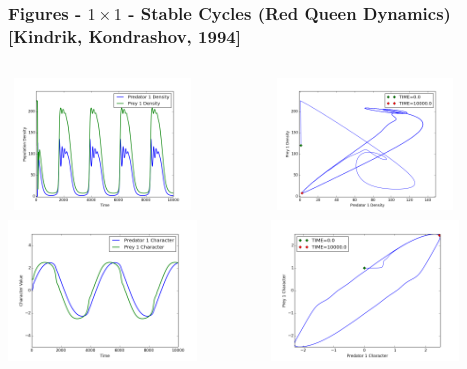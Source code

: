 \documentclass[10pt]{beamer}
\begin{document}
\begin{frame}
	\frametitle{Figures - $1\times1$ - Stable Cycles {\normalsize(Red Queen Dynamics)}{\tiny[Kindrik, Kondrashov, 1994]}}
	\begin{columns}[t]
		\begin{column}{.5\textwidth}
			\centering
			\includegraphics[width=5cm,height=3.5cm]{figures/1x1/variable_growth/stable_cycles/densities.png}\\
			\includegraphics[width=5cm,height=4cm]{figures/1x1/variable_growth/stable_cycles/traits.png}
		\end{column}
		\begin{column}{.5\textwidth}
			\centering
			\includegraphics[width=5cm,height=3.5cm]{figures/1x1/variable_growth/stable_cycles/density_phase_plane.png}\\
			\includegraphics[width=5cm,height=4cm]{figures/1x1/variable_growth/stable_cycles/trait_phase_plane.png}
		\end{column}
	\end{columns}
\end{frame}
\end{document}
